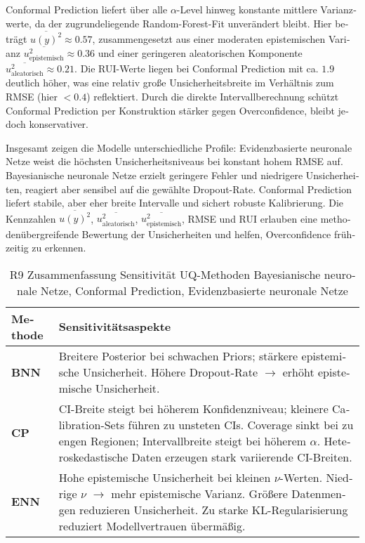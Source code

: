 \begin{otherlanguage}{ngerman}
\gls{Conformal Prediction} liefert über alle \(\alpha\)-Level hinweg konstante mittlere Varianzwerte, da der zugrundeliegende Random-Forest-Fit unverändert bleibt. Hier beträgt \(\overline{u(y)^2} \approx 0.57\), zusammengesetzt aus einer moderaten epistemischen Varianz \(\overline{u_{\text{epistemisch}}^2} \approx 0.36\) und einer geringeren aleatorischen Komponente \(\overline{u_{\text{aleatorisch}}^2} \approx 0.21\). Die RUI-Werte liegen bei \gls{Conformal Prediction} mit ca. \(1.9\) deutlich höher, was eine relativ große Unsicherheitsbreite im Verhältnis zum RMSE (hier \(< 0.4\)) reflektiert. Durch die direkte Intervallberechnung schützt \gls{Conformal Prediction} per Konstruktion stärker gegen Overconfidence, bleibt jedoch konservativer.  

Insgesamt zeigen die Modelle unterschiedliche Profile: \gls{Evidenzbasierte neuronale Netze} weist die höchsten Unsicherheitsniveaus bei konstant hohem RMSE auf. \gls{Bayesianische neuronale Netze} erzielt geringere Fehler und niedrigere Unsicherheiten, reagiert aber sensibel auf die gewählte Dropout-Rate. \gls{Conformal Prediction} liefert stabile, aber eher breite Intervalle und sichert robuste Kalibrierung. Die Kennzahlen \(\overline{u(y)^2}\), \(\overline{u_{\text{aleatorisch}}^2}\), \(\overline{u_{\text{epistemisch}}^2}\), RMSE und RUI erlauben eine methodenübergreifende Bewertung der Unsicherheiten und helfen, Overconfidence frühzeitig zu erkennen.



\begin{table}[!htbp]
\centering
\footnotesize
\begin{tabularx}{\textwidth}{|l|X|}
\hline
\textbf{Methode} & \textbf{Sensitivitätsaspekte} \\
\hline
\textbf{BNN} &
Breitere Posterior bei schwachen Priors; stärkere epistemische Unsicherheit. Höhere Dropout-Rate \(\rightarrow\) erhöht epistemische Unsicherheit. \\
\hline
\textbf{CP} &
CI-Breite steigt bei höherem Konfidenzniveau; kleinere Calibration-Sets führen zu unsteten CIs. Coverage sinkt bei zu engen Regionen; Intervallbreite steigt bei höherem \(\alpha\). Heteroskedastische Daten erzeugen stark variierende CI-Breiten. \\
\hline
\textbf{ENN} &
Hohe epistemische Unsicherheit bei kleinen \(\nu\)-Werten. Niedrige \(\nu\) \(\rightarrow\) mehr epistemische Varianz. Größere Datenmengen reduzieren Unsicherheit. Zu starke KL-Regularisierung reduziert Modellvertrauen übermäßig. \\
\hline
\end{tabularx}
\caption{R9 Zusammenfassung Sensitivität UQ-Methoden \gls{Bayesianische neuronale Netze}, \gls{Conformal Prediction}, \gls{Evidenzbasierte neuronale Netze}}
\label{tab:sensitivity_r9_transposed}
\end{table}




\end{otherlanguage}

